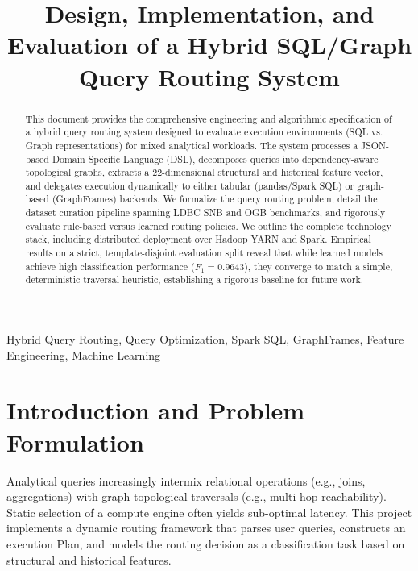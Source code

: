 \documentclass[conference]{IEEEtran}
\begin{document}
\title{Design, Implementation, and Evaluation of a Hybrid SQL/Graph Query Routing System}

\author{
}

\maketitle

\begin{abstract}
This document provides the comprehensive engineering and algorithmic specification of a hybrid query routing system designed to evaluate execution environments (SQL vs. Graph representations) for mixed analytical workloads. The system processes a JSON-based Domain Specific Language (DSL), decomposes queries into dependency-aware topological graphs, extracts a 22-dimensional structural and historical feature vector, and delegates execution dynamically to either tabular (pandas/Spark SQL) or graph-based (GraphFrames) backends. We formalize the query routing problem, detail the dataset curation pipeline spanning LDBC SNB and OGB benchmarks, and rigorously evaluate rule-based versus learned routing policies. We outline the complete technology stack, including distributed deployment over Hadoop YARN and Spark. Empirical results on a strict, template-disjoint evaluation split reveal that while learned models achieve high classification performance ($F_1 = 0.9643$), they converge to match a simple, deterministic traversal heuristic, establishing a rigorous baseline for future work.
\end{abstract}

\begin{IEEEkeywords}
Hybrid Query Routing, Query Optimization, Spark SQL, GraphFrames, Feature Engineering, Machine Learning
\end{IEEEkeywords}

\section{Introduction and Problem Formulation}
Analytical queries increasingly intermix relational operations (e.g., joins, aggregations) with graph-topological traversals (e.g., multi-hop reachability). Static selection of a compute engine often yields sub-optimal latency. This project implements a dynamic routing framework that parses user queries, constructs an execution Plan, and models the routing decision as a classification task based on structural and historical features.
\end{document}
